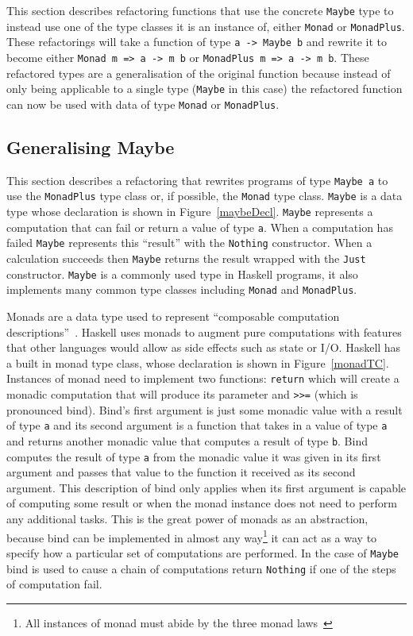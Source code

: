 This section describes refactoring functions that use the concrete \texttt{Maybe} type to instead use one of the type classes it is an instance of, either \texttt{Monad} or \texttt{MonadPlus}. These refactorings will take a function of type \texttt{a -> Maybe b} and rewrite it to become either \texttt{Monad m => a -> m b} or \texttt{MonadPlus m => a -> m b}. These refactored types are a generalisation of the original function because instead of only being applicable to a single type (\texttt{Maybe} in this case) the refactored function can now be used with data of type \texttt{Monad} or \texttt{MonadPlus}.

\subsection{Generalising Maybe}

This section describes a refactoring that rewrites programs of type \texttt{Maybe a} to use the \texttt{MonadPlus} type class or, if possible, the \texttt{Monad} type class. \texttt{Maybe} is a data type whose declaration is shown in Figure~\ref{maybeDecl}. \texttt{Maybe} represents a computation that can fail or return a value of type \texttt{a}. When a computation has failed \texttt{Maybe} represents this ``result'' with the \texttt{Nothing} constructor. When a calculation succeeds then \texttt{Maybe} returns the result wrapped with the \texttt{Just} constructor. \texttt{Maybe} is a commonly used type in Haskell programs, it also implements many common type classes including \texttt{Monad} and \texttt{MonadPlus}.

Monads are a data type used to represent ``composable computation descriptions''~\citep{haskellWikiMonad}. Haskell uses monads to augment pure computations with features that other languages would allow as side effects such as state or I/O. Haskell has a built in monad type class, whose declaration is shown in Figure~\ref{monadTC}. Instances of monad need to implement two functions: \texttt{return} which will create a monadic computation that will produce its parameter and \texttt{>>=} (which is pronounced bind). Bind's first argument is just some monadic value with a result of type \texttt{a} and its second argument is a function that takes in a value of type \texttt{a} and returns another monadic value that computes a result of type \texttt{b}. Bind computes the result of type \texttt{a} from the monadic value it was given in its first argument and passes that value to the function it received as its second argument. This description of bind only applies when its first argument is capable of computing some result or when the monad instance does not need to perform any additional tasks. This is the great power of monads as an abstraction, because bind can be implemented in almost any way\footnote{All instances of monad must abide by the three monad laws~\citep{monadLaws}} it can act as a way to specify how a particular set of computations are performed. In the case of \texttt{Maybe} bind is used to cause a chain of computations return \texttt{Nothing} if one of the steps of computation fail.

